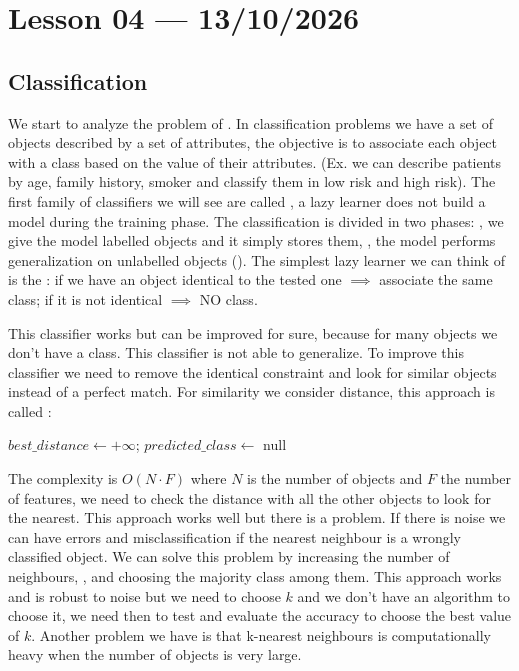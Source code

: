 \section{Lesson 04 --- 13/10/2026}
\subsection{Classification}
We start to analyze the problem of . In classification problems we have a set of objects described by a set of attributes, the objective is to associate each object with a class based on the value of their attributes. (Ex. we can describe patients by age, family
history, smoker and classify them in low risk and high risk). The first family of classifiers we will see are called , a lazy learner does not build a model during the training phase. The classification is divided in two phases: , we give the model labelled objects and it simply stores them, , the model performs generalization on unlabelled objects (). The simplest lazy learner we can think of is the : if we have an object identical to the tested one $\implies$ associate the same class; if it is not identical $\implies$ NO class.

This classifier works but can be improved for sure, because for many objects we don't have a class. This classifier is not able to generalize. To improve this classifier we need to remove the identical constraint and look for similar objects instead of a perfect match. For similarity we consider distance, this approach is called :

\begin{algorithm}[ht]
\caption{1-Nearest Neighbour}
$best\_distance \leftarrow +\infty$; $predicted\_class \leftarrow$ null\;
\;
\end{algorithm}

The complexity is $O(N\cdot F)$ where $N$ is the number of objects and $F$ the number of features, we need to check the distance with all the other objects to look for the nearest. This approach works well but there is a problem. If there is noise we can have errors and misclassification if the nearest neighbour is a wrongly classified object. We can solve this problem by increasing the number of neighbours, , and choosing the majority class among them. This approach works and is robust to noise but we need to choose $k$ and we don't have an algorithm to choose it, we need then to test and evaluate the accuracy to choose the best value of $k$. Another problem we have is that k-nearest neighbours is computationally heavy when the number of objects is very large.

